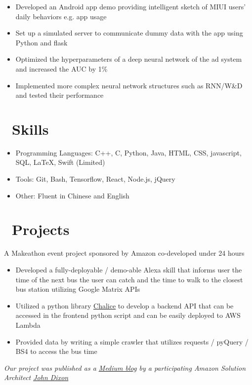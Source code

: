 \documentclass{resume}
\begin{document}
\vspace{-1ex}
\begin{itemize}
	\item Developed an Android app demo providing intelligent sketch of MIUI users' daily behaviors e.g. app usage
	\item Set up a simulated server to communicate dummy data with the app using Python and flask
  	\item Optimized the hyperparameters of a deep neural network of the ad system and increased the AUC by 1\%
 	\item Implemented more complex neural network structures such as RNN/W\&D and tested their performance
\end{itemize}


\section{\faCogs\ Skills}
\begin{itemize}[parsep=0.5ex]
  \item Programming Languages: C++, C, Python, Java, HTML, CSS,  javascript, SQL, \LaTeX, Swift (Limited)
  \item Tools: Git, Bash, Tensorflow, React, Node.js, jQuery
  \item Other: Fluent in Chinese and English
\end{itemize}

\section{\faWrench\ Projects}
A Makeathon event project sponsored by Amazon co-developed under 24 hours
\begin{itemize}
	\item Developed a fully-deployable / demo-able Alexa skill that informs user the time of the next bus the user can catch and the time to walk to the closest bus station utilizing Google Matrix APIs
	\item Utilized a python library \href{https://github.com/aws/chalice}{\underline{Chalice}} to develop a backend API that can be accessed in the frontend python script and can be easily deployed to AWS Lambda
	\item Provided data by writing a simple crawler that utilizes requests / pyQuery / BS4 to access the bus time
\end{itemize}
\textit{Our project was published as a \href{https://medium.com/voice-tech-podcast/alexa-when-is-the-next-bus-620e1aba9474}{\underline{Medium blog}} by a participating Amazon Solution Architect \href{https://www.linkedin.com/in/jpd44/}{\underline{John Dixon}}}
\end{document}
